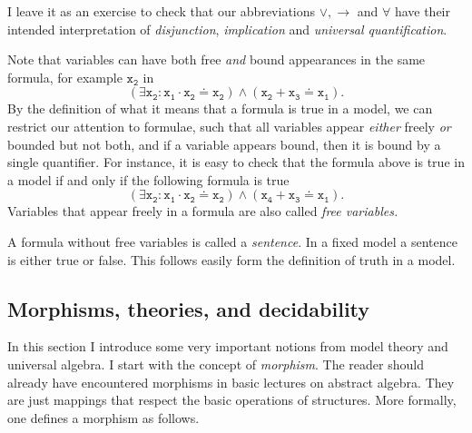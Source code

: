\begin{rem}
  \begin{exlist}
    \item I leave it as an exercise to check that our abbreviations \(∨, →\)
    and \(∀\) have their intended interpretation of \emph{disjunction},
    \emph{implication} and \emph{universal quantification}.

    \item Note that variables can have both free \emph{and} bound appearances in
    the same formula, for example \(\mathtt{x_2}\) in
    \[
      \mathtt{(∃ x_2 : x_1 \cdot x_2 \doteq x_2) ∧ (x_2 + x_3 \doteq x_1)}.
    \]
    By the definition of what it means that a formula is true in a model, we can
    restrict our attention to formulae, such that all variables appear
    \emph{either} freely \emph{or} bounded but not both, and if a variable
    appears bound, then it is bound by a single quantifier. For instance, it is
    easy to check that the formula above is true in a model if and only if the
    following formula is true
    \[
      \mathtt{(∃ x_2 : x_1 \cdot x_2 \doteq x_2) ∧ (x_4 + x_3 \doteq x_1)}.
    \]
    Variables that appear freely in a formula are also called \emph{free
    variables.}
  \end{exlist}
\end{rem}

A formula without free variables is called a \emph{sentence}. In a fixed model a
sentence is either true or false. This follows easily form the definition of
truth in a model.

\subsection{Morphisms, theories, and decidability}\label{sec:theories}

In this section I introduce some very important notions from model theory and
universal algebra. I start with the concept of \emph{morphism}. The reader
should already have encountered morphisms in basic lectures on abstract algebra.
They are just mappings that respect the basic operations of structures. More
formally, one defines a morphism as follows.

